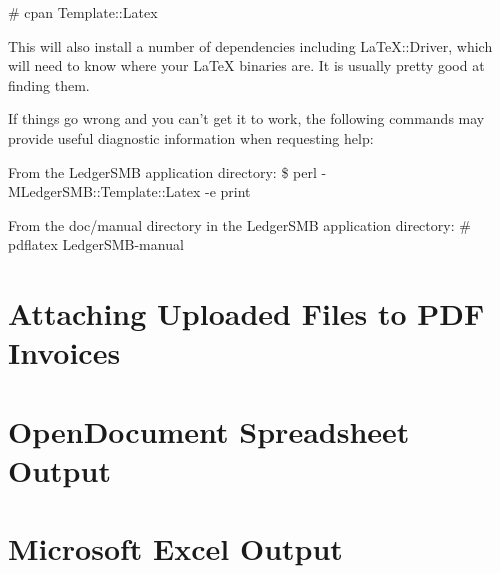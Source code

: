 \# cpan Template::Latex

This will also install a number of dependencies including
LaTeX::Driver, which will need to know where your LaTeX binaries are.
It is usually pretty good at finding them.

If things go wrong and you can't get it to work, the following
commands may provide useful diagnostic information when requesting
help:

From the LedgerSMB application directory:
\$ perl -MLedgerSMB::Template::Latex -e print

From the doc/manual directory in the LedgerSMB application directory:
\# pdflatex LedgerSMB-manual

\section{Attaching Uploaded Files to PDF Invoices}
\label{sec-options-uploaded-files-invoices}

\section{OpenDocument Spreadsheet Output}
\label{sec-options-ODS-spreadsheet-output}


\section{Microsoft Excel Output}
\label{sec-options-XLS-spreadsheet-output}

